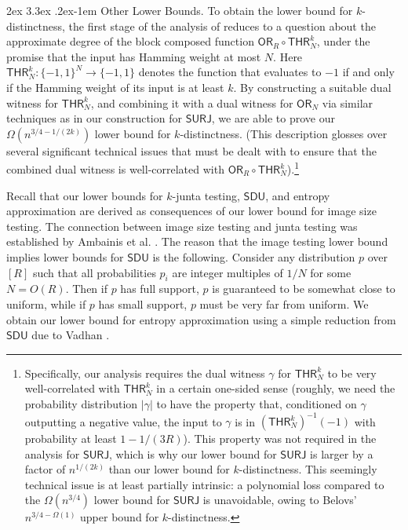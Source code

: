 \documentclass[11pt, letterpaper, fleqn]{article}
\makeatletter
\newcommand{\para}{
  \@startsection{paragraph}{4}
  {\z@}{2ex \@plus 3.3ex \@minus .2ex}{-1em}
  {\normalfont\normalsize\bfseries}
}
\theoremstyle{plain}
\newcommand{\SURJ}{\mathsf{ SURJ}}
\newcommand{\SDU}{\mathsf{ SDU}}
\newcommand{\OR}{\mathsf{ OR}}
\newcommand{\bits}{\{-1,1\}}
\makeatother
\begin{document}
\para{Other Lower Bounds.}
To obtain the lower bound for $k$-distinctness, the first stage
of the analysis of \cite{adegsurj} reduces to a question about the approximate degree
of the block composed function $\OR_R \circ \mathsf{THR}^k_N$, under the promise that the input has Hamming weight at most $N$.
Here $\mathsf{THR}^k_N \colon \bits^N \to \bits$ denotes the function that evaluates to $-1$ if and only if the Hamming weight of its input is at least $k$.
By constructing a suitable dual witness for $\mathsf{THR}^k_N$, and combining it with a dual witness for $\OR_N$ via similar techniques as in our construction for $\SURJ$, we are able to prove our $\Omega(n^{3/4-1/(2k)})$ lower bound for $k$-distinctness. (This description glosses over several significant technical issues that
must be dealt with to ensure that the combined dual witness is well-correlated with $\OR_R \circ \mathsf{THR}^k_N$).\footnote{Specifically, our analysis requires the dual witness $\gamma$
for $\mathsf{THR}^k_N$ to be very well-correlated with $\mathsf{THR}^k_N$ in a certain one-sided sense (roughly, we need the probability distribution $|\gamma|$ to have the property that,
conditioned on $\gamma$ outputting a negative value, the input to $\gamma$
is in $\left(\mathsf{THR}^k_N\right)^{-1}(-1)$ with probability at least $1-1/(3R)$). 
This property was not required in the analysis for $\SURJ$, which is why
our lower bound for $\SURJ$ is larger by a factor of $n^{1/(2k)}$ than
our lower bound for $k$-distinctness. This seemingly technical issue 
is at least partially intrinsic:
a polynomial loss compared to the $\Omega(n^{3/4})$ lower
bound for $\SURJ$ is unavoidable, owing to Belovs' $n^{3/4 - \Omega(1)}$ upper bound \cite{belovs} for $k$-distinctness.}

\medskip


Recall that our lower bounds for $k$-junta testing, $\SDU$, and entropy approximation
are derived as consequences of our lower bound for image size testing. 
The connection between image size testing and junta testing was established by Ambainis et al. \cite{juntatesting}.
The reason that the image testing lower bound implies lower bounds for $\SDU$
is the following. Consider any distribution $p$ over $[R]$ such that all probabilities $p_i$ are integer multiples of $1/N$ for some $N=O(R)$. Then if $p$ has full support, $p$ is guaranteed 
to be somewhat close to uniform, while if $p$ has small support, $p$
must be very far from uniform.
We obtain our lower bound for entropy approximation using
a simple reduction from $\SDU$ due to Vadhan \cite{vadhan}.
\end{document}
